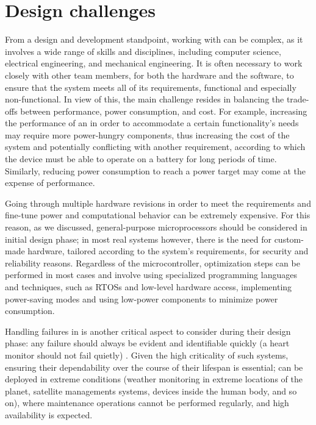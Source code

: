 \section{Design challenges}
From a design and development standpoint, working with \ess can be complex, as it involves a wide range of skills and disciplines, including computer science, electrical engineering, and mechanical engineering. It is often necessary to work closely with other team members, for both the hardware and the software, to ensure that the system meets all of its requirements, functional and especially non-functional. 
In view of this, the main challenge resides in balancing the trade-offs between performance, power consumption, and cost.
For example, increasing the performance of an \es in order to accommodate a certain functionality's needs may require more power-hungry components, thus increasing the cost of the system and potentially conflicting with another requirement, according to which the device must be able to operate on a battery for long periods of time. Similarly, reducing power consumption to reach a power target may come at the expense of performance. 

Going through multiple hardware revisions in order to meet the requirements and fine-tune power and computational behavior can be extremely expensive. For this reason, as we discussed, general-purpose microprocessors should be considered in initial design phase; in most real systems however, there is the need for custom-made hardware, tailored according to the system's requirements, for security and reliability reasons.
Regardless of the microcontroller, optimization steps can be performed in most cases and involve using specialized programming languages and techniques, such as RTOSs and low-level hardware access, implementing power-saving modes and using low-power components to minimize power consumption.

Handling failures in \ess is another critical aspect to consider during their design phase: any failure should always be evident and identifiable quickly (a heart monitor should not fail quietly) \cite{MakingEmbeddedSystems}. Given the high criticality of such systems, ensuring their dependability over the course of their lifespan is essential; \ess can be deployed in extreme conditions (\ie weather monitoring in extreme locations of the planet, satellite managements systems, devices inside the human body, and so on), where maintenance operations cannot be performed regularly, and high availability is expected. 

